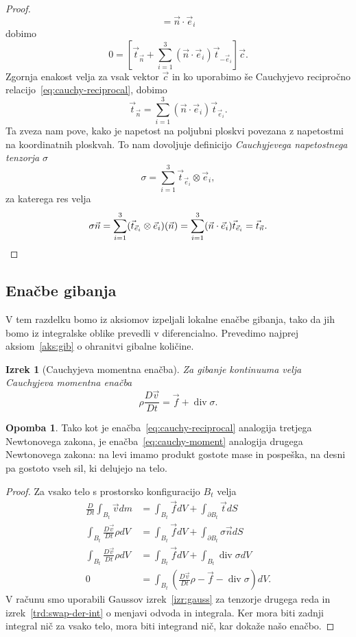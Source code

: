 \documentclass[12pt,a4paper,twoside]{article}
\theoremstyle{definition} %
\newtheorem{opomba}[definicija]{Opomba}
\theoremstyle{plain} %
\newtheorem{izrek}[definicija]{Izrek}
\numberwithin{equation}{section}
\renewcommand{\div}{\operatorname{div}}
\newcommand{\DD}[2]{\ensuremath{\frac{D #1}{D #2}}}
\newcommand{\DDt}[1]{\DD{#1}{t}}
\newcommand{\vv}{\vec{v}}
\newcommand{\vt}{\vec{t}}
\newcommand{\vc}{\vec{c}}
\newcommand{\vn}{\vec{n}}
\newcommand{\vf}{\vec{f}}
\newcommand{\ts}{\sigma}
\begin{document}
\begin{proof}
\[  = \vn\cdot\vec{e}_i
\]
dobimo
\[
  0 = \left[\vt_{\vn} + \sum_{i=1}^3 (\vn \cdot\vec{e}_i) \vt_{-\vec{e}_i}\right]\vc.
\]
Zgornja enakost velja za vsak vektor $\vc$ in ko uporabimo še Cauchyjevo recipročno
relacijo~\eqref{eq:cauchy-reciprocal}, dobimo
\[
  \vt_{\vn} = \sum_{i=1}^3 (\vn \cdot\vec{e}_i) \vt_{\vec{e}_i}.
\]
Ta zveza nam pove, kako je napetost na poljubni ploskvi povezana z napetostmi na koordinatnih
ploskvah. To nam dovoljuje definicijo \emph{Cauchyjevega napetostnega tenzorja}
$\ts$
\[
  \ts = \sum_{i=1}^3 \vt_{\vec{e}_i}\otimes \vec{e}_i,
\]
za katerega res velja
\[
  \ts\vn = \sum_{i=1}^3 (\vt_{\vec{e}_i}\otimes \vec{e}_i)(\vn) =
  \sum_{i=1}^3 (\vn \cdot\vec{e}_i) \vt_{\vec{e}_i} = \vt_{\vn}. \qedhere
\]
\end{proof}

\subsection{Enačbe gibanja}
V tem razdelku bomo iz aksiomov izpeljali lokalne enačbe gibanja, tako da jih
bomo iz integralske oblike prevedli v diferencialno.
Prevedimo najprej aksiom~\ref{aks:gib} o ohranitvi gibalne količine.
\begin{izrek}[Cauchyjeva momentna enačba]
  Za gibanje kontinuuma velja Cauchyjeva momentna enačba
  \begin{equation}
    \rho \DDt{\vv} = \vf + \div \sigma.
    \label{eq:cauchy-moment}
  \end{equation}
\end{izrek}
\begin{opomba}
  Tako kot je enačba~\eqref{eq:cauchy-reciprocal} analogija tretjega Newtonovega zakona, je
  enačba~\eqref{eq:cauchy-moment} analogija drugega Newtonovega zakona: na levi imamo produkt
  gostote mase in pospeška, na desni pa gostoto vseh sil, ki delujejo na telo.
\end{opomba}
\begin{proof}
Za vsako telo s prostorsko konfiguracijo $B_t$ velja
\begin{align*}
  \DDt{} \int_{B_t} \vv dm &= \int_{B_t} \vf dV + \int_{\partial {B_t}} \vt dS \\
  \int_{B_t} \DDt{\vv}\rho dV &= \int_{B_t} \vf dV + \int_{\partial {B_t}} \ts \vn dS \\
  \int_{B_t} \DDt{\vv}\rho dV &= \int_{B_t} \vf dV + \int_{B_t} \div \ts dV \\
  0 &= \int_{B_t}\left(\DDt{\vv}\rho - \vf - \div \ts\right) dV.
\end{align*}
V računu smo uporabili Gaussov izrek~\ref{izr:gauss} za tenzorje drugega reda in
izrek~\ref{trd:swap-der-int} o menjavi odvoda in integrala. Ker mora biti zadnji
integral nič za vsako telo, mora biti integrand nič, kar dokaže našo enačbo.
\end{proof}
\end{document}

